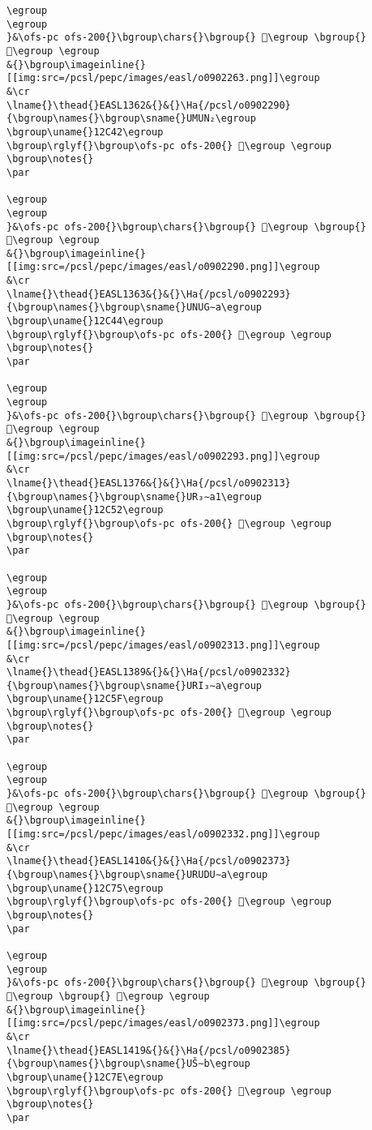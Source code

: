 \begin{verbatim}
\egroup
\egroup
}&\ofs-pc ofs-200{}\bgroup\chars{}\bgroup{} 𒰼\egroup \bgroup{} 𒰳\egroup \egroup
&{}\bgroup\imageinline{}[[img:src=/pcsl/pepc/images/easl/o0902263.png]]\egroup
&\cr
\lname{}\thead{}EASL1362&{}&{}\Ha{/pcsl/o0902290}{\bgroup\names{}\bgroup\sname{}UMUN₂\egroup
\bgroup\uname{}12C42\egroup
\bgroup\rglyf{}\bgroup\ofs-pc ofs-200{} 𒱂\egroup \egroup
\bgroup\notes{}
\par 

\egroup
\egroup
}&\ofs-pc ofs-200{}\bgroup\chars{}\bgroup{} 𒱃\egroup \bgroup{} 𒱂\egroup \egroup
&{}\bgroup\imageinline{}[[img:src=/pcsl/pepc/images/easl/o0902290.png]]\egroup
&\cr
\lname{}\thead{}EASL1363&{}&{}\Ha{/pcsl/o0902293}{\bgroup\names{}\bgroup\sname{}UNUG∼a\egroup
\bgroup\uname{}12C44\egroup
\bgroup\rglyf{}\bgroup\ofs-pc ofs-200{} 𒱄\egroup \egroup
\bgroup\notes{}
\par 

\egroup
\egroup
}&\ofs-pc ofs-200{}\bgroup\chars{}\bgroup{} 𒱆\egroup \bgroup{} 𒱄\egroup \egroup
&{}\bgroup\imageinline{}[[img:src=/pcsl/pepc/images/easl/o0902293.png]]\egroup
&\cr
\lname{}\thead{}EASL1376&{}&{}\Ha{/pcsl/o0902313}{\bgroup\names{}\bgroup\sname{}UR₃∼a1\egroup
\bgroup\uname{}12C52\egroup
\bgroup\rglyf{}\bgroup\ofs-pc ofs-200{} 𒱒\egroup \egroup
\bgroup\notes{}
\par 

\egroup
\egroup
}&\ofs-pc ofs-200{}\bgroup\chars{}\bgroup{} 𒱒\egroup \bgroup{} 𒱓\egroup \egroup
&{}\bgroup\imageinline{}[[img:src=/pcsl/pepc/images/easl/o0902313.png]]\egroup
&\cr
\lname{}\thead{}EASL1389&{}&{}\Ha{/pcsl/o0902332}{\bgroup\names{}\bgroup\sname{}URI₃∼a\egroup
\bgroup\uname{}12C5F\egroup
\bgroup\rglyf{}\bgroup\ofs-pc ofs-200{} 𒱟\egroup \egroup
\bgroup\notes{}
\par 

\egroup
\egroup
}&\ofs-pc ofs-200{}\bgroup\chars{}\bgroup{} 𒱟\egroup \bgroup{} 𒱠\egroup \egroup
&{}\bgroup\imageinline{}[[img:src=/pcsl/pepc/images/easl/o0902332.png]]\egroup
&\cr
\lname{}\thead{}EASL1410&{}&{}\Ha{/pcsl/o0902373}{\bgroup\names{}\bgroup\sname{}URUDU∼a\egroup
\bgroup\uname{}12C75\egroup
\bgroup\rglyf{}\bgroup\ofs-pc ofs-200{} 𒱵\egroup \egroup
\bgroup\notes{}
\par 

\egroup
\egroup
}&\ofs-pc ofs-200{}\bgroup\chars{}\bgroup{} 𒱳\egroup \bgroup{} 𒱴\egroup \bgroup{} 𒱵\egroup \egroup
&{}\bgroup\imageinline{}[[img:src=/pcsl/pepc/images/easl/o0902373.png]]\egroup
&\cr
\lname{}\thead{}EASL1419&{}&{}\Ha{/pcsl/o0902385}{\bgroup\names{}\bgroup\sname{}UŠ∼b\egroup
\bgroup\uname{}12C7E\egroup
\bgroup\rglyf{}\bgroup\ofs-pc ofs-200{} 𒱾\egroup \egroup
\bgroup\notes{}
\par 


\end{verbatim}
